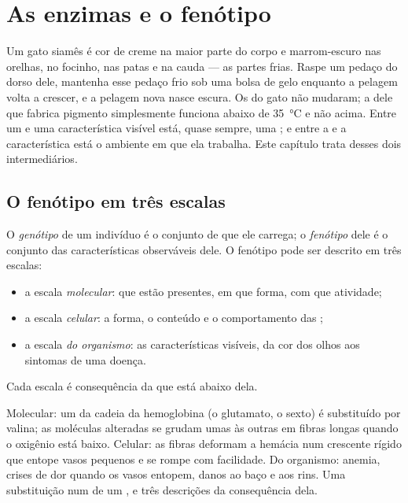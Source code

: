 \chapter{As enzimas e o fenótipo}\label{ch:g11:enzymes-and-phenotype}

Um gato siamês é cor de creme na maior parte do corpo e marrom-escuro
nas orelhas, no focinho, nas patas e na cauda --- as partes frias.
Raspe um pedaço do dorso dele, mantenha esse pedaço frio sob uma bolsa
de gelo enquanto a pelagem volta a crescer, e a pelagem nova nasce
escura. Os  do gato não mudaram; a  dele que fabrica
pigmento simplesmente funciona abaixo de \qty{35}{\celsius} e não acima.
Entre um  e uma característica visível está, quase sempre, uma
; e entre a  e a característica está o ambiente em que ela
trabalha. Este capítulo trata desses dois intermediários.

\section{O fenótipo em três escalas}

\begin{definition}\label{def:g11:enzymes-and-phenotype:phenotype}
O \emph{genótipo} de um indivíduo é o conjunto de
 que ele carrega; o \emph{fenótipo} dele é o
conjunto das características observáveis dele. O fenótipo pode ser
descrito em três escalas:
\begin{itemize}
  \item a escala \emph{molecular}: que  estão presentes, em
        que forma, com que atividade;
  \item a escala \emph{celular}: a forma, o conteúdo e o comportamento
        das ;
  \item a escala \emph{do organismo}: as características visíveis, da
        cor dos olhos aos sintomas de uma doença.
\end{itemize}
Cada escala é consequência da que está abaixo dela.
\end{definition}

\begin{example}\label{ex:g11:enzymes-and-phenotype:sickle}
Molecular: um  da cadeia da hemoglobina (o glutamato, o
sexto) é substituído por valina; as moléculas alteradas se grudam umas
às outras em fibras longas quando o oxigênio está baixo. Celular: as
fibras deformam a hemácia num crescente rígido que entope vasos
pequenos e se rompe com facilidade. Do organismo: anemia, crises de dor
quando os vasos entopem, danos ao baço e aos rins. Uma substituição num
 de um , e três descrições da consequência dela.
\end{example}

